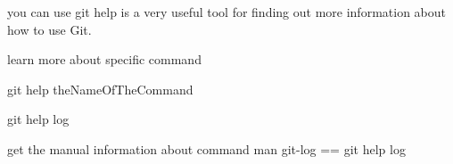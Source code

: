 you can use  
  git help 
    is a very useful tool for finding out more information about how to use Git.

learn more about specific command 

git help theNameOfTheCommand

git help log

get the manual information about command
man git-log    ==   git help log  
